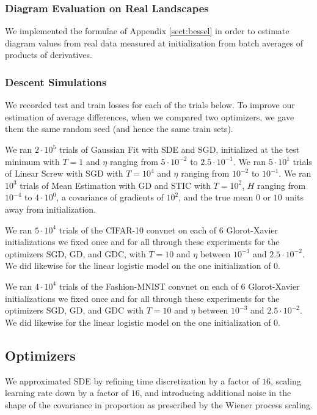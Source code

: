 \documentclass{article}
\theoremstyle{plain}
\theoremstyle{definition}
\begin{document}
        \subsubsection*{Diagram Evaluation on Real Landscapes}
            We implemented the formulae of Appendix \ref{sect:bessel} in order
            to estimate diagram values from real data measured at
            initialization from batch averages of products of derivatives.

        \subsubsection*{Descent Simulations}
            We recorded test and train losses for each of the trials below.  To
            improve our estimation of average differences, when we compared two
            optimizers, we gave them the same random seed (and hence the same
            train sets).

            We ran $2 \cdot 10^5$ trials of Gaussian Fit with SDE and SGD,
            initialized at the test minimum with $T=1$ and $\eta$ ranging from
            $5\cdot 10^{-2}$ to $2.5\cdot 10^{-1}$.
            We ran $5 \cdot 10^1$ trials of Linear Screw with SGD with $T=10^4$
            and $\eta$ ranging from $10^{-2}$ to $10^{-1}$.
            We ran $10^3$ trials of Mean Estimation with GD and STIC
            with $T=10^2$, $H$ ranging from $10^{-4}$ to $4 \cdot 10^0$,
            a covariance of gradients of $10^2$, and the true mean $0$ or
            $10$ units away from initialization.

            We ran $5 \cdot 10^4$ trials of the CIFAR-10 convnet on each of $6$
                Glorot-Xavier initializations we fixed once and for all through 
                these experiments for the optimizers SGD, GD, and GDC, with
                $T=10$ and $\eta$ between $10^{-3}$ and $2.5 \cdot 10^{-2}$.
                We did likewise for the linear logistic model on the one
                initialization of $0$.

            We ran $4 \cdot 10^4$ trials of the Fashion-MNIST convnet on each of $6$
                Glorot-Xavier initializations we fixed once and for all through 
                these experiments for the optimizers SGD, GD, and GDC with
                $T=10$ and $\eta$ between $10^{-3}$ and $2.5 \cdot 10^{-2}$.
                We did likewise for the linear logistic model on the one
                initialization of $0$. 

    \subsection{Optimizers}
        We approximated SDE by refining time discretization by a factor of
        $16$, scaling learning rate down by a factor of $16$, and introducing
        additional noise in the shape of the covariance in proportion as
        prescribed by the Wiener process scaling.
\end{document}
